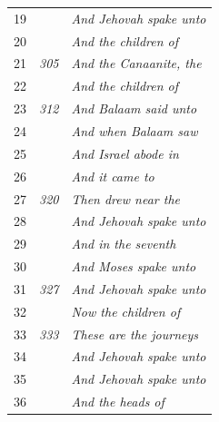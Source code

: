 \documentclass{article}
\newlength{\minipageheight}
\newlength{\minipagewidth}
\begin{document}
\begin{minipage}[r][\minipageheight][t]{\minipagewidth}
\begin{longtable}{ccl}
        19          &              & \textit{And Jehovah spake unto}    \\
        20          &              & \textit{And the children of}       \\
        21          & \textit{305} & \textit{And the Canaanite, the}    \\
        22          &              & \textit{And the children of}       \\
        23          & \textit{312} & \textit{And Balaam said unto}      \\
        24          &              & \textit{And when Balaam saw}       \\
        25          &              & \textit{And Israel abode in}       \\
        26          &              & \textit{And it came to}            \\
        27          & \textit{320} & \textit{Then drew near the}        \\
        28          &              & \textit{And Jehovah spake unto}    \\
        29          &              & \textit{And in the seventh}        \\
        30          &              & \textit{And Moses spake unto}      \\
        31          & \textit{327} & \textit{And Jehovah spake unto}    \\
        32          &              & \textit{Now the children of}       \\
        33          & \textit{333} & \textit{These are the journeys}    \\
        34          &              & \textit{And Jehovah spake unto}    \\
        35          &              & \textit{And Jehovah spake unto}    \\
        36          &              & \textit{And the heads of}          \\


\end{longtable}
\end{minipage}
\end{document}
